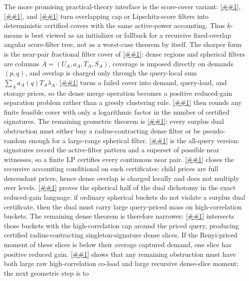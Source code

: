 \documentclass[10pt]{article}
\newcommand{\cref}[1]{\ref{##1}}
\newcommand{\Cref}[1]{\ref{##1}}
\theoremstyle{definition}
\begin{document}
The more promising practical-theory interface is the score-cover variant:
\cref{lem:cap-slack-cover}, \cref{lem:lipschitz-score-cover}, and
\cref{lem:shell-normalized-cap-cover} turn overlapping cap or Lipschitz-score
filters into deterministic certified covers with the same active-power
accounting. Thus $k$-means is best viewed as an initializer or fallback for a
recursive fixed-overlap angular score-filter tree, not as a worst-case theorem
by itself.  The sharper form is the near-pair fractional filter cover of
\cref{lem:finite-filter-cover-dual}: dense regions and spherical filters are
columns \(A=(U_A,a_A,T_A,S_A)\), coverage is imposed directly on demands
\((p,q)\), and overlap is charged only through the query-local sum
\(\sum_Aa_A(q)T_A\lambda_A\).  \Cref{cor:filter-cover-column-generation} turns a
failed cover into demand, query-load, and storage prices, so the dense merge
operation becomes a positive reduced-gain separation problem rather than a
greedy clustering rule.  \Cref{lem:poisson-filter-cover-materialization} then
rounds any finite feasible cover with only a logarithmic factor in the number of
certified signatures.  The remaining geometric theorem is
\cref{asm:weighted-dense-spherical-dichotomy}: every surplus dual obstruction
must either buy a radius-contracting dense filter or be pseudo-random enough for
a large-range spherical filter.  \Cref{lem:finite-signature-filter-cover} is the
all-query version: signatures record the active-filter pattern and a superset of
possible near witnesses, so a finite LP certifies every continuous near pair.
\Cref{prop:fractional-filter-cover-polylog} closes the recursive accounting
conditional on such certificates: child prices are full descendant prices, hence
dense overlap is charged locally and does not multiply over levels.
\Cref{lem:weighted-spherical-reduced-gain} proves the spherical half of the
dual dichotomy in the exact reduced-gain language: if ordinary spherical buckets
do not violate a surplus dual certificate, then the dual must carry large
query-priced mass on high-correlation buckets.  The remaining dense theorem is
therefore narrower: \cref{lem:high-correlation-dense-slice-separator} intersects
those buckets with the high-correlation cap around the priced query, producing
certified radius-contracting singleton-signature dense slices.  If the
Renyi-priced moment of these slices is below their average captured demand, one
slice has positive reduced gain.  \Cref{cor:spherical-dense-moment-obstruction}
shows that any remaining obstruction must have both large raw high-correlation
co-load and large recursive dense-slice moment; the next geometric step is to
\end{document}
